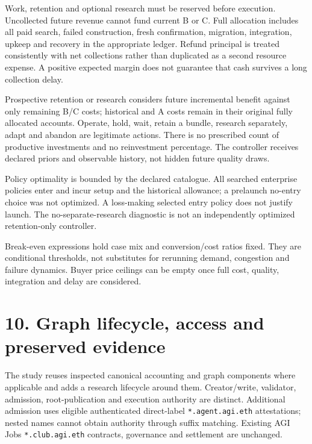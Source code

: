 \documentclass[
  10pt,
]{article}
\let\studysection\section
\renewcommand{\section}{\Needspace{7\baselineskip}\studysection}
\begin{document}
Work, retention and optional research must be reserved before execution.
Uncollected future revenue cannot fund current B or C. Full allocation
includes all paid search, failed construction, fresh confirmation,
migration, integration, upkeep and recovery in the appropriate ledger.
Refund principal is treated consistently with net collections rather
than duplicated as a second resource expense. A positive expected margin
does not guarantee that cash survives a long collection delay.

Prospective retention or research considers future incremental benefit
against only remaining B/C costs; historical and A costs remain in their
original fully allocated accounts. Operate, hold, wait, retain a bundle,
research separately, adapt and abandon are legitimate actions. There is
no prescribed count of productive investments and no reinvestment
percentage. The controller receives declared priors and observable
history, not hidden future quality draws.

Policy optimality is bounded by the declared catalogue. All searched
enterprise policies enter and incur setup and the historical allowance;
a prelaunch no-entry choice was not optimized. A loss-making selected
entry policy does not justify launch. The no-separate-research
diagnostic is not an independently optimized retention-only controller.

Break-even expressions hold case mix and conversion/cost ratios fixed.
They are conditional thresholds, not substitutes for rerunning demand,
congestion and failure dynamics. Buyer price ceilings can be empty once
full cost, quality, integration and delay are considered.

\hypertarget{10-graph-lifecycle-access-and-preserved-evidence}{%
\section{10. Graph lifecycle, access and preserved
evidence}\label{10-graph-lifecycle-access-and-preserved-evidence}}

The study reuses inspected canonical accounting and graph components
where applicable and adds a research lifecycle around them.
Creator/write, validator, admission, root-publication and execution
authority are distinct. Additional admission uses eligible authenticated
direct-label \texttt{*.agent.agi.eth} attestations; nested names cannot
obtain authority through suffix matching. Existing AGI Jobs
\texttt{*.club.agi.eth} contracts, governance and settlement are
unchanged.
\end{document}
